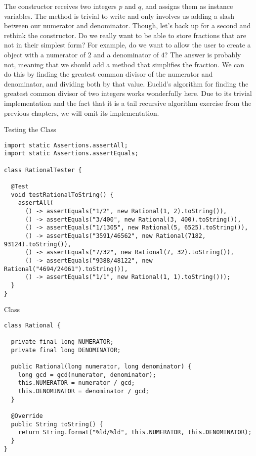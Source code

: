 The  constructor receives two integers $p$ and $q$, and assigns them as instance variables. The  method is trivial to write and only involves us adding a slash between our numerator and denominator. Though, let's back up for a second and rethink the constructor. Do we really want to be able to store fractions that are not in their simplest form? For example, do we want to allow the user to create a  object with a numerator of $2$ and a denominator of $4$? The answer is probably not, meaning that we should add a method that simplifies the fraction. We can do this by finding the greatest common divisor of the numerator and denominator, and dividing both by that value. Euclid's algorithm for finding the greatest common divisor of two integers works wonderfully here. Due to its trivial implementation and the fact that it is a tail recursive algorithm exercise from the previous chapters, we will omit its implementation.

\begin{cl}{Testing the  Class}
\begin{lstlisting}[language=MyJava]
import static Assertions.assertAll;
import static Assertions.assertEquals;

class RationalTester {
  
  @Test
  void testRationalToString() {
    assertAll(
      () -> assertEquals("1/2", new Rational(1, 2).toString()),
      () -> assertEquals("3/400", new Rational(3, 400).toString()),
      () -> assertEquals("1/1305", new Rational(5, 6525).toString()),
      () -> assertEquals("3591/46562", new Rational(7182, 93124).toString()),
      () -> assertEquals("7/32", new Rational(7, 32).toString()),
      () -> assertEquals("9388/48122", new Rational("4694/24061").toString()),
      () -> assertEquals("1/1", new Rational(1, 1).toString()));
  }
}
\end{lstlisting}
\end{cl}

\begin{cl}{ Class}
\begin{lstlisting}[language=MyJava]
class Rational {
  
  private final long NUMERATOR;
  private final long DENOMINATOR;

  public Rational(long numerator, long denominator) {
    long gcd = gcd(numerator, denominator);
    this.NUMERATOR = numerator / gcd;
    this.DENOMINATOR = denominator / gcd; 
  }

  @Override
  public String toString() {
    return String.format("%ld/%ld", this.NUMERATOR, this.DENOMINATOR);
  }
}
\end{lstlisting}
\end{cl}

